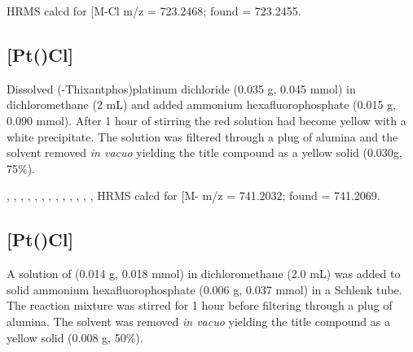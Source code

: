 HRMS calcd for  [M-Cl\ce{]+} m/z = 723.2468; found = 723.2455.


\subsection*{[Pt(\tButhixantphosk)Cl]}


Dissolved (\tBu-Thixantphos)platinum dichloride (0.035 g, 0.045 mmol) in dichloromethane (2 mL) and added ammonium hexafluorophosphate (0.015 g, 0.090 mmol).  After 1 hour of stirring the red solution had become yellow with a white precipitate.  The solution was filtered through a plug of alumina and the solvent removed \emph{in vacuo} yielding the title compound as a yellow solid (0.030g, 75\%).  

,
,
,
,
,
,
,
,
,
,
,
,
,
HRMS calcd for  [M-\ce{PF6]+} m/z = 741.2032; found = 741.2069.


\subsection*{[Pt(\tBuxantphosk)Cl]}
%

A solution of \tBuxantphos{} (0.014 g, 0.018 mmol) in dichloromethane (2.0 mL) was added to solid ammonium hexafluorophosphate (0.006 g, 0.037 mmol) in a Schlenk tube.  The reaction mixture was stirred for 1 hour before filtering through a plug of alumina.  The solvent was removed \emph{in vacuo} yielding the title compound as a yellow solid (0.008 g, 50\%).  

